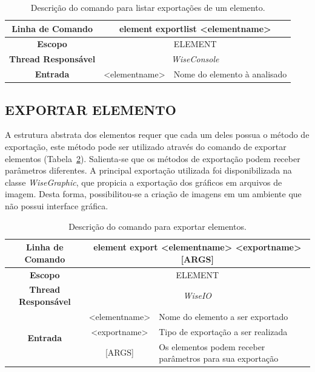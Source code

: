 \begin{center}
	\begin{table}[!htbp]
		\begin{tabularx}{\textwidth}{c|c|X}
			\toprule
			\textbf{Linha de Comando} & \multicolumn{2}{c}{element export\underline{\space\space}list <element\underline{\space\space}name>}  \\
			\midrule
			\textbf{Escopo} & \multicolumn{2}{c}{ELEMENT} \\
			\hline
			\textbf{Thread Responsável} & \multicolumn{2}{c}{\textit{WiseConsole}} \\
			\hline
			\textbf{Entrada} & <element\underline{\space\space}name> & Nome do elemento à analisado \\
			\bottomrule
		\end{tabularx}
		\caption{Descrição do comando para listar exportações de um elemento.}
		\label{tab:export_list_element}
	\end{table}
\end{center}

\subsection{EXPORTAR ELEMENTO}\label{sec:export_element}

A estrutura abstrata dos elementos requer que cada um deles possua o método de exportação, este método pode ser utilizado através do comando de exportar elementos (Tabela~\ref{tab:export}). Salienta-se que os métodos de exportação podem receber parâmetros diferentes. A principal exportação utilizada foi disponibilizada na classe \textit{WiseGraphic}, que propicia a exportação dos gráficos em arquivos de imagem. Desta forma, possibilitou-se a criação de imagens em um ambiente que não possui interface gráfica.

\begin{center}
	\begin{table}[!htbp]
		\begin{tabularx}{\textwidth}{c|c|X}
			\toprule
			\textbf{Linha de Comando} & \multicolumn{2}{c}{element export <element\underline{\space\space}name> <export\underline{\space\space}name> [ARGS]} \\
			\midrule
			\textbf{Escopo} & \multicolumn{2}{c}{ELEMENT} \\
			\hline
			\textbf{Thread Responsável} & \multicolumn{2}{c}{\textit{WiseIO}} \\
			\hline
			\multirow{3}{*}{\textbf{Entrada}} & <element\underline{\space\space}name> & Nome do elemento a ser exportado \\
			& <export\underline{\space\space}name> & Tipo de exportação a ser realizada \\
			& [ARGS] & Os elementos podem receber parâmetros para sua exportação \\
			\bottomrule
		\end{tabularx}
		\caption{Descrição do comando para exportar elementos.}
		\label{tab:export}
	\end{table}
\end{center}

